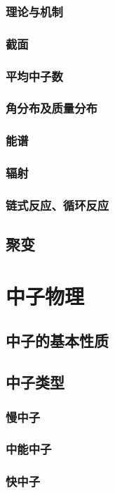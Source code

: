 \documentclass[UTF8]{../06-Physics}
\begin{document}
        \subsubsection{理论与机制}
        \subsubsection{截面}
        \subsubsection{平均中子数}
        \subsubsection{角分布及质量分布}
        \subsubsection{能谱}
        \subsubsection{辐射}
        \subsubsection{链式反应、循环反应}
    \subsection{聚变}




\section{中子物理}
    \subsection{中子的基本性质}
    \subsection{中子类型}
        \subsubsection{慢中子}
        \subsubsection{中能中子}
        \subsubsection{快中子}
\end{document}
